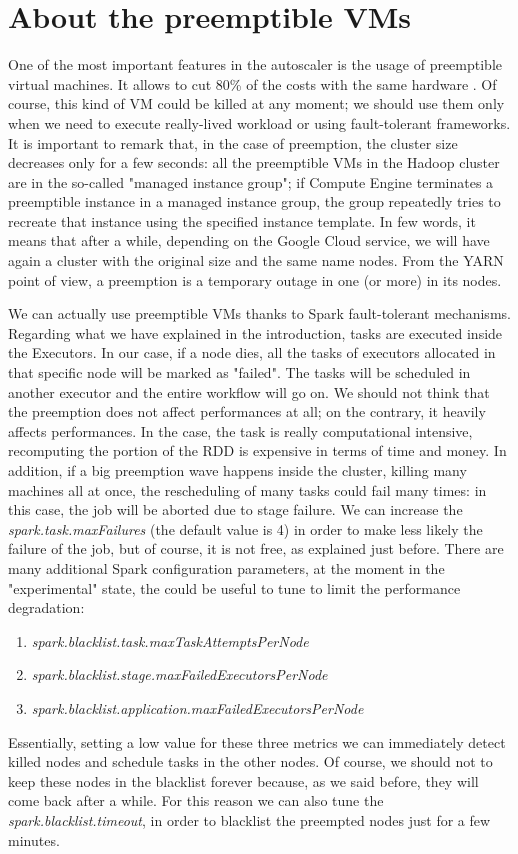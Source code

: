 \documentclass[12pt,twoside,cucitura]{toptesi}
\begin{document}
\section{About the preemptible VMs} \label{preemptible_explain}
One of the most important features in the autoscaler is the usage of preemptible virtual machines. It allows to cut 80\% of the costs with the same hardware \cite{preemptible-vms}. Of course, this kind of VM could be killed at any moment; we should use them only when we need to execute really-lived workload or using fault-tolerant frameworks. It is important to remark that, in the case of preemption, the cluster size decreases only for a few seconds: all the preemptible VMs in the Hadoop cluster are in the so-called "managed instance group"; if Compute Engine terminates a preemptible instance in a managed instance group, the group repeatedly tries to recreate that instance using the specified instance template. In few words, it means that after a while, depending on the Google Cloud service, we will have again a cluster with the original size and the same name nodes. From the YARN point of view, a preemption is a temporary outage in one (or more) in its nodes.
 
We can actually use preemptible VMs thanks to Spark fault-tolerant mechanisms. Regarding what we have explained in the introduction, tasks are executed inside the Executors. In our case, if a node dies, all the tasks of executors allocated in that specific node will be marked as "failed". The tasks will be scheduled in another executor and the entire workflow will go on. We should not think that the preemption does not affect performances at all; on the contrary, it heavily affects performances. In the case, the task is really computational intensive, recomputing the portion of the RDD is expensive in terms of time and money. In addition, if a big preemption wave happens inside the cluster, killing many machines all at once, the rescheduling of many tasks could fail many times: in this case, the job will be aborted due to stage failure. We can increase the \textit{spark.task.maxFailures} (the default value is 4) in order to make less likely the failure of the job, but of course, it is not free, as explained just before. There are many additional Spark configuration parameters, at the moment in the "experimental" state, the could be useful to tune to limit the performance degradation:
\begin{enumerate}
	\item \textit{spark.blacklist.task.maxTaskAttemptsPerNode}
	\item \textit{spark.blacklist.stage.maxFailedExecutorsPerNode}
	\item \textit{spark.blacklist.application.maxFailedExecutorsPerNode}
\end{enumerate}
Essentially, setting a low value for these three metrics we can immediately detect killed nodes and schedule tasks in the other nodes. Of course, we should not to keep these nodes in the blacklist forever because, as we said before, they will come back after a while. For this reason we can also tune the \textit{spark.blacklist.timeout}, in order to blacklist the preempted nodes just for a few minutes.
\end{document}
